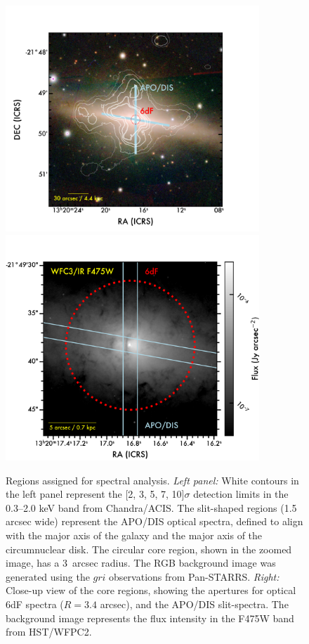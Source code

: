 \documentclass[modern]{CORE-AAS/aastex631}
\begin{document}
{\begin{figure}[t!]
\begin{center}
\includegraphics[trim={0 0 70 0}, clip, height=8.5cm]{FIGURES/NGC5084_spectra_regions_wide.png}\includegraphics[trim={0 0 0 0}, clip, height=8.5cm]{FIGURES/NGC5084_regions_core.png}
\caption{Regions assigned for spectral analysis. \emph{Left panel:} White contours in the left panel represent the [2, 3, 5, 7, 10]$\sigma$ detection limits in the 0.3--2.0 keV band from Chandra/ACIS. The slit-shaped regions (1.5 arcsec wide) represent the APO/DIS optical spectra, defined to align with the major axis of the galaxy and the major axis of the circumnuclear disk. The circular core region, shown in the zoomed image, has a 3~arcsec radius. The RGB background image was generated using the $gri$ observations from Pan-STARRS. \emph{Right:} Close-up view of the core regions, showing the apertures for optical 6dF spectra ($R=3.4$ arcsec), and the APO/DIS slit-spectra. The background image represents the flux intensity in the F475W band from HST/WFPC2.} 
\label{fig:NGC5084_spectra_regions}
\end{center}
\end{figure}


}
\end{document}
